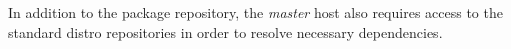 In addition to the \OHPC{} package repository, the {\em master} host also
requires access to the standard distro repositories in order to resolve
necessary dependencies.


